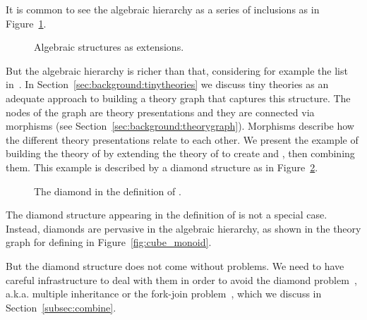 It is common to see the algebraic hierarchy as a series of inclusions as in Figure~\ref{fig:flatExtensions}. 
\begin{figure}
\caption{Algebraic structures as extensions.}
\label{fig:flatExtensions}
\end{figure}  
But the algebraic hierarchy is richer than that, considering for example the list in~\cite{jipsen}. 
In Section~\ref{sec:background:tinytheories} we discuss tiny theories as an adequate approach to building a theory graph that captures this structure. The nodes of the graph are theory presentations and they are connected via morphisms (see Section~\ref{sec:background:theorygraph}). Morphisms describe how the different theory presentations relate to each other. 
We present the example of building the theory of  by extending the theory of  to create  and , then combining them. This example is described by a diamond structure as in Figure~\ref{fig:unitalDiamond}. 
\begin{figure}
\caption{The diamond in the definition of .}
\label{fig:unitalDiamond}
\end{figure}
The diamond structure appearing in the definition of  is not a special case. Instead, diamonds are pervasive in the algebraic hierarchy, as shown in the theory graph for defining  in Figure~\ref{fig:cube_monoid}. 

But the diamond structure does not come without problems. We need to have careful infrastructure to deal with them in order to avoid the diamond problem~\cite{jigsaw1992,traits2006,diamonds2011}, a.k.a. multiple inheritance or the fork-join problem~\cite{sakkinen1989disciplined}, which we discuss in Section~\ref{subsec:combine}.

